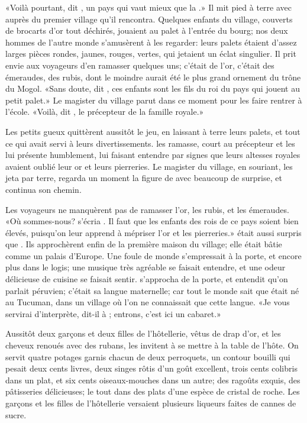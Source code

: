«Voilà pourtant, dit , un pays qui vaut mieux que la .»
Il mit pied à terre avec  auprès du premier village qu’il
rencontra. Quelques enfants du village, couverts de brocarts d’or tout
déchirés, jouaient au palet à l’entrée du bourg; nos deux hommes de
l’autre monde s’amusèrent à les regarder: leurs palets étaient d’assez
larges pièces rondes, jaunes, rouges, vertes, qui jetaient un éclat
singulier. Il prit envie aux voyageurs d’en ramasser quelques uns;
c’était de l’or, c’était des émeraudes, des rubis, dont le moindre
aurait été le plus grand ornement du trône du Mogol. «Sans doute, dit
, ces enfants sont les fils du roi du pays qui jouent au petit
palet.» Le magister du village parut dans ce moment pour les faire
rentrer à l’école. «Voilà, dit , le précepteur de la famille
royale.»

Les petits gueux quittèrent aussitôt le jeu, en laissant à terre leurs
palets, et tout ce qui avait servi à leurs divertissements. les
ramasse, court au précepteur et les lui présente humblement, lui faisant
entendre par signes que leurs altesses royales avaient oublié leur or
et leurs pierreries. Le magister du village, en souriant, les jeta par
terre, regarda un moment la figure de  avec beaucoup de
surprise, et continua son chemin.


Les voyageurs ne manquèrent pas de ramasser l’or, les rubis, et les
émeraudes. «Où sommes-nous? s’écria . Il faut que les enfants des
rois de ce pays soient bien élevés, puisqu’on leur apprend à mépriser
l’or et les pierreries.»  était aussi surpris que . Ils
approchèrent enfin de la première maison du village; elle était bâtie
comme un palais d’Europe. Une foule de monde s’empressait à la porte,
et encore plus dans le logis; une musique très agréable se faisait
entendre, et une odeur délicieuse de cuisine se faisait sentir. 
s’approcha de la porte, et entendit qu’on parlait péruvien; c’était sa
langue maternelle; car tout le monde sait que  était né au
Tucuman, dans un village où l’on ne connaissait que cette langue. «Je
vous servirai d’interprète, dit-il à ; entrons, c’est ici un
cabaret.»

Aussitôt deux garçons et deux filles de l’hôtellerie, vêtus de drap
d’or, et les cheveux renoués avec des rubans, les invitent à se mettre
à la table de l’hôte. On servit quatre potages garnis chacun de deux
perroquets, un contour bouilli qui pesait deux cents livres, deux
singes rôtis d’un goût excellent, trois cents colibris dans un plat, et
six cents oiseaux-mouches dans un autre; des ragoûts exquis, des
pâtisseries délicieuses; le tout dans des plats d’une espèce de cristal
de roche. Les garçons et les filles de l’hôtellerie versaient plusieurs
liqueurs faites de cannes de sucre.

